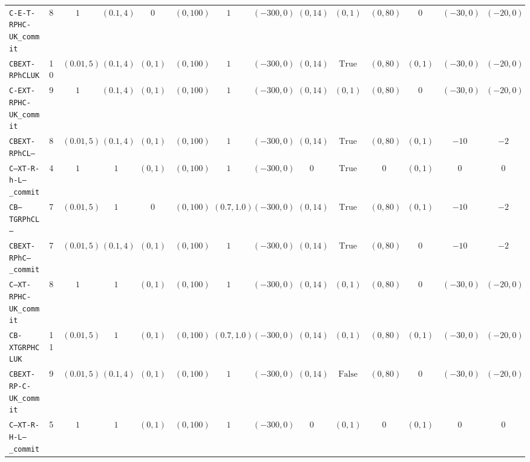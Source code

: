 {\begin{tabular}{lccccccccccccc}
\texttt{C-E-T-RPHC-UK_commit} & 8 & $1$ & $(0.1,4)$ & $0$ & $(0,100)$ & $1$ & $(-300,0)$ & $(0,14)$ & $(0,1)$ & $(0,80)$ & $0$ & $(-30,0)$ & $(-20,0)$ \\
\texttt{CBEXT-RPhCLUK} & 10 & $(0.01,5)$ & $(0.1,4)$ & $(0,1)$ & $(0,100)$ & $1$ & $(-300,0)$ & $(0,14)$ & $\mathrm{True}$ & $(0,80)$ & $(0,1)$ & $(-30,0)$ & $(-20,0)$ \\
\texttt{C-EXT-RPHC-UK_commit} & 9 & $1$ & $(0.1,4)$ & $(0,1)$ & $(0,100)$ & $1$ & $(-300,0)$ & $(0,14)$ & $(0,1)$ & $(0,80)$ & $0$ & $(-30,0)$ & $(-20,0)$ \\
\texttt{CBEXT-RPhCL--} & 8 & $(0.01,5)$ & $(0.1,4)$ & $(0,1)$ & $(0,100)$ & $1$ & $(-300,0)$ & $(0,14)$ & $\mathrm{True}$ & $(0,80)$ & $(0,1)$ & $-10$ & $-2$ \\
\texttt{C--XT-R-h-L--_commit} & 4 & $1$ & $1$ & $(0,1)$ & $(0,100)$ & $1$ & $(-300,0)$ & $0$ & $\mathrm{True}$ & $0$ & $(0,1)$ & $0$ & $0$ \\
\texttt{CB--TGRPhCL--} & 7 & $(0.01,5)$ & $1$ & $0$ & $(0,100)$ & $(0.7,1.0)$ & $(-300,0)$ & $(0,14)$ & $\mathrm{True}$ & $(0,80)$ & $(0,1)$ & $-10$ & $-2$ \\
\texttt{CBEXT-RPhC---_commit} & 7 & $(0.01,5)$ & $(0.1,4)$ & $(0,1)$ & $(0,100)$ & $1$ & $(-300,0)$ & $(0,14)$ & $\mathrm{True}$ & $(0,80)$ & $0$ & $-10$ & $-2$ \\
\texttt{C--XT-RPHC-UK_commit} & 8 & $1$ & $1$ & $(0,1)$ & $(0,100)$ & $1$ & $(-300,0)$ & $(0,14)$ & $(0,1)$ & $(0,80)$ & $0$ & $(-30,0)$ & $(-20,0)$ \\
\texttt{CB-XTGRPHCLUK} & 11 & $(0.01,5)$ & $1$ & $(0,1)$ & $(0,100)$ & $(0.7,1.0)$ & $(-300,0)$ & $(0,14)$ & $(0,1)$ & $(0,80)$ & $(0,1)$ & $(-30,0)$ & $(-20,0)$ \\
\texttt{CBEXT-RP-C-UK_commit} & 9 & $(0.01,5)$ & $(0.1,4)$ & $(0,1)$ & $(0,100)$ & $1$ & $(-300,0)$ & $(0,14)$ & $\mathrm{False}$ & $(0,80)$ & $0$ & $(-30,0)$ & $(-20,0)$ \\
\texttt{C--XT-R-H-L--_commit} & 5 & $1$ & $1$ & $(0,1)$ & $(0,100)$ & $1$ & $(-300,0)$ & $0$ & $(0,1)$ & $0$ & $(0,1)$ & $0$ & $0$ \\
\bottomrule
\end{tabular}
}
